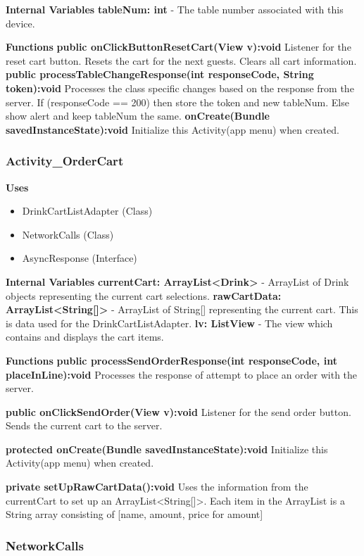 \documentclass [10pt]{article}
\begin{document}
\textbf{Internal Variables}
\textbf{tableNum: int} - The table number associated with this device.

\textbf{Functions}
\textbf{public onClickButtonResetCart(View v):void}
Listener for the reset cart button. Resets the cart for the next guests. Clears all cart information.
\textbf{public processTableChangeResponse(int responseCode, String token):void}
Processes the class specific changes based on the response from the server. If (responseCode == 200) then store the token and new tableNum. Else show alert and keep tableNum the same.
\textbf{onCreate(Bundle savedInstanceState):void}
Initialize this Activity(app menu) when created.

\subsubsection{Activity\_OrderCart}

\textbf{Uses}

\begin{itemize}
	\item DrinkCartListAdapter (Class)
	\item NetworkCalls (Class)
	\item AsyncResponse (Interface)
\end{itemize}

\textbf{Internal Variables}
\textbf{currentCart: ArrayList<Drink>} - ArrayList of Drink objects representing the current cart selections.
\textbf{rawCartData: ArrayList<String[]>} - ArrayList of String[] representing the current cart. This is data used for the DrinkCartListAdapter.
\textbf{lv: ListView} - The view which contains and displays the cart items.

\textbf{Functions}
\textbf{public processSendOrderResponse(int responseCode, int placeInLine):void}
Processes the response of attempt to place an order with the server.

\textbf{public onClickSendOrder(View v):void}
Listener for the send order button. Sends the current cart to the server.

\textbf{protected onCreate(Bundle savedInstanceState):void}
Initialize this Activity(app menu) when created.

\textbf{private setUpRawCartData():void}
Uses the information from the currentCart to set up an ArrayList<String[]>. Each item in the ArrayList is a String array consisting of [name, amount, price for amount]

\subsubsection{NetworkCalls}
\end{document}
